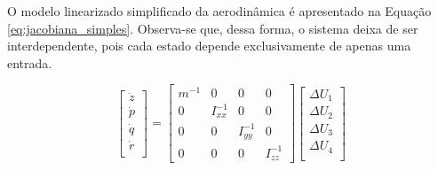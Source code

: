 \documentclass[main.tex]{subfiles}
\begin{document}
O modelo linearizado simplificado da aerodinâmica é apresentado na Equação \ref{eq:jacobiana_simples}. Observa-se que, dessa forma, o sistema deixa de ser interdependente, pois cada estado depende exclusivamente de apenas uma entrada.

\begin{equation}\label{eq:jacobiana_simples}
	\begin{bmatrix}
		\ddot{z}\\
		\dot{p}\\
		\dot{q}\\
		\dot{r}\\
	\end{bmatrix} = \begin{bmatrix}
		m^{-1} & 0 & 0 & 0\\
		
		0 & I_{xx}^{-1} & 0 & 0\\
		
		0 & 0 & I_{yy}^{-1} & 0\\
		
		0 & 0 & 0 & I_{zz}^{-1}
	\end{bmatrix}\begin{bmatrix}
		\Delta U_1\\
		\Delta U_2\\
		\Delta U_3\\
		\Delta U_4\\
	\end{bmatrix}
\end{equation}
\end{document}
